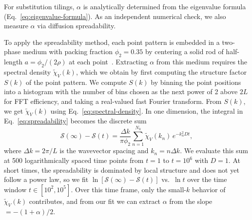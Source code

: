 \documentclass[11pt]{article}
\begin{document}
For substitution tilings, $\alpha$ is analytically determined from the eigenvalue formula (Eq.~\eqref{eq:eigenvalue-formula}). As an independent numerical check, we also measure $\alpha$ via diffusion spreadability.

To apply the spreadability method, each point pattern is embedded in a two-phase medium with packing fraction $\phi_2 = 0.35$ by centering a solid rod of half-length $a = \phi_2/(2\rho)$ at each point~\cite{hitinbialus2024}. Extracting $\alpha$ from this medium requires the spectral density $\tilde\chi_V(k)$, which we obtain by first computing the structure factor $S(k)$ of the point pattern. We compute $S(k)$ by binning the point positions into a histogram with the number of bins chosen as the next power of 2 above $2L$ for FFT efficiency, and taking a real-valued fast Fourier transform. From $S(k)$, we get $\tilde\chi_V(k)$ using Eq.~\eqref{eq:spectral-density}. In one dimension, the integral in Eq.~\eqref{eq:spreadability} becomes the discrete sum
\begin{equation}
 \mathcal{S}(\infty) - \mathcal{S}(t) = \frac{\Delta k}{\pi\phi_2}\sum_{n=1}^{N_k} \tilde\chi_V(k_n)\,e^{-k_n^2 D t},
 \label{eq:spreadability-discrete}
\end{equation}
where $\Delta k = 2\pi/L$ is the wavevector spacing and $k_n = n\Delta k$. We evaluate this sum at 500 logarithmically spaced time points from $t = 1$ to $t = 10^6$ with $D = 1$. At short times, the spreadability is dominated by local structure and does not yet follow a power law, so we fit $\ln[\mathcal{S}(\infty) - \mathcal{S}(t)]$ vs.\ $\ln t$ over the time window $t \in [10^2, 10^5]$. Over this time frame, only the small-$k$ behavior of $\tilde\chi_V(k)$ contributes, and from our fit we can extract $\alpha$ from the slope $= -(1+\alpha)/2$.
\end{document}
